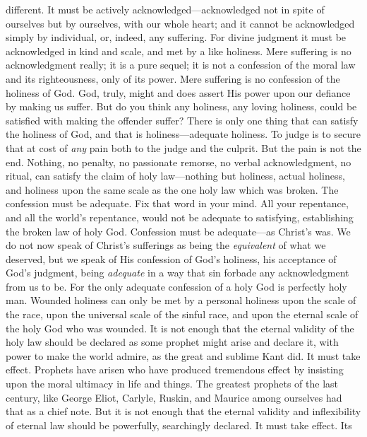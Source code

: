 \documentclass[12pt,a5paper,twoside,titlepage]{book}
\begin{document}
different. It must be actively acknowledged---acknowledged 
not in spite of ourselves but by 
ourselves, with our whole heart; and it cannot 
be acknowledged simply by individual, or, indeed, 
any suffering. For divine judgment it 
must be acknowledged in kind and scale, and 
met by a like holiness. Mere suffering is no 
acknowledgment really; it is a pure sequel; it 
is not a confession of the moral law and its 
righteousness, only of its power. Mere suffering 
is no confession of the holiness of God. God, 
truly, might and does assert His power upon 
our defiance by making us suffer. But do you 
think any holiness, any loving holiness, could 
be satisfied with making the offender suffer? 
There is only one thing that can satisfy the 
holiness of God, and that is holiness---adequate 
holiness. To judge is to secure that at cost of 
\textit{any} pain both to the judge and the culprit. But 
the pain is not the end. Nothing, no penalty, 
no passionate remorse, no verbal acknowledgment, 
no ritual, can satisfy the claim of holy 
law---nothing but holiness, actual holiness, and 
holiness upon the same scale as the one holy 
law which was broken. The confession must be 
adequate. Fix that word in your mind. All 
your repentance, and all the world's repentance, 
would not be adequate to satisfying, establishing 
the broken law of holy God. Confession 
must be adequate---as Christ's was. We do not 
now speak of Christ's sufferings as being the 
\textit{equivalent} of what we deserved, but we speak 
of His confession of God's holiness, his acceptance 
of God's judgment, being \textit{adequate} in a 
way that sin forbade any acknowledgment 
from us to be. For the only adequate confession 
of a holy God is perfectly holy man. 
Wounded holiness can only be met by a 
personal holiness upon the scale of the race, 
upon the universal scale of the sinful race, and 
upon the eternal scale of the holy God who was 
wounded. It is not enough that the eternal 
validity of the holy law should be declared as 
some prophet might arise and declare it, with 
power to make the world admire, as the great 
and sublime Kant did. It must take effect. 
Prophets have arisen who have produced 
tremendous effect by insisting upon the moral 
ultimacy in life and things. The greatest 
prophets of the last century, like George Eliot, 
Carlyle, Ruskin, and Maurice among ourselves 
had that as a chief note. But it is not 
enough that the eternal validity and inflexibility 
of eternal law should be powerfully, 
searchingly declared. It must take effect. Its 
\end{document}
